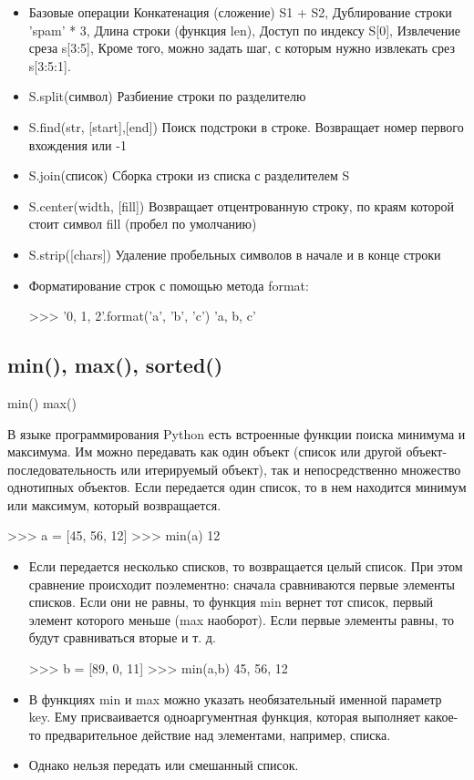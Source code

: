	\begin{itemize}
	
		\item Базовые операции
		Конкатенация (сложение) S1 + S2, Дублирование строки 'spam' * 3, Длина строки (функция len), Доступ по индексу S[0], Извлечение среза s[3:5], Кроме того, можно задать шаг, с которым нужно извлекать срез s[3:5:1]. 
		\item S.split(символ)	Разбиение строки по разделителю
		\item S.find(str, [start],[end])	Поиск подстроки в строке. Возвращает номер первого вхождения или -1
		\item S.join(список)	Сборка строки из списка с разделителем S
		\item S.center(width, [fill])	Возвращает отцентрованную строку, по краям которой стоит символ fill (пробел по умолчанию)
		\item S.strip([chars])	Удаление пробельных символов в начале и в конце строки
		\item Форматирование строк с помощью метода format:
		\begin{python}
			>>> '{0}, {1}, {2}'.format('a', 'b', 'c')
			'a, b, c'
		\end{python}
	\end{itemize}
	
\subsection{min(), max(), sorted()}

	min() max()

		В языке программирования Python есть встроенные функции поиска минимума и максимума. Им можно передавать как один объект (список или другой объект-последовательность или итерируемый объект), так и непосредственно множество однотипных объектов. Если передается один список, то в нем находится минимум или максимум, который возвращается.
	\begin{python}
		>>> a = [45, 56, 12] 
		>>> min(a) 
		12 
	\end{python}
	\begin{itemize}
			
		\item Если передается несколько списков, то возвращается целый список. При этом сравнение происходит поэлементно: сначала сравниваются первые элементы списков. Если они не равны, то функция min вернет тот список, первый элемент которого меньше (max наоборот). Если первые элементы равны, то будут сравниваться вторые и т. д.
		\begin{python}
>>> b = [89, 0, 11] 
>>> min(a,b) 
45, 56, 12
		\end{python}
		\item В функциях min и max можно указать необязательный именной параметр key. Ему присваивается одноаргументная функция, которая выполняет какое-то предварительное действие над элементами, например, списка.
		\item Однако нельзя передать или смешанный список.	
	\end{itemize}

